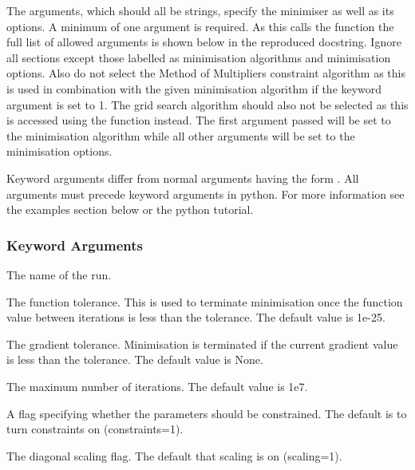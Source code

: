 The arguments, which should all be strings, specify the minimiser as well as its options.  A minimum of one argument is required.  As this calls the function  the full list of allowed arguments is shown below in the reproduced  docstring. Ignore all sections except those labelled as minimisation algorithms and minimisation options.  Also do not select the Method of Multipliers constraint algorithm as this is used in combination with the given minimisation algorithm if the keyword argument  is set to 1.  The grid search algorithm should also not be selected as this is accessed using the  function instead.  The first argument passed will be set to the minimisation algorithm while all other arguments will be set to the minimisation options. 
  

 Keyword arguments differ from normal arguments having the form .  All arguments must precede keyword arguments in python.  For more information see the examples section below or the python tutorial. 
  

  
 \subsubsection{Keyword Arguments} 

   The name of the run.   

   The function tolerance.  This is used to terminate minimisation once the function value between iterations is less than the tolerance.  The default value is 1e-25.   

   The gradient tolerance.  Minimisation is terminated if the current gradient value is less than the tolerance.  The default value is None.   

   The maximum number of iterations.  The default value is 1e7.   

   A flag specifying whether the parameters should be constrained.  The default is to turn constraints on (constraints=1).   

   The diagonal scaling flag.  The default that scaling is on (scaling=1).  

